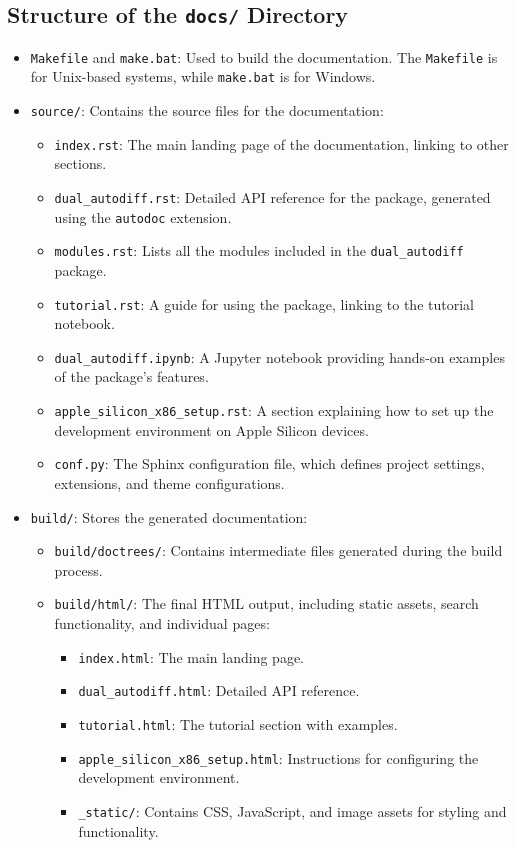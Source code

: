 \documentclass[a4paper,12pt]{article}
\begin{document}
\subsection{Structure of the \texttt{docs/} Directory}
\begin{itemize}
    \item \texttt{Makefile} and \texttt{make.bat}: Used to build the documentation. The \texttt{Makefile} is for Unix-based systems, while \texttt{make.bat} is for Windows.
    \item \texttt{source/}: Contains the source files for the documentation:
    \begin{itemize}
        \item \texttt{index.rst}: The main landing page of the documentation, linking to other sections.
        \item \texttt{dual\_autodiff.rst}: Detailed API reference for the package, generated using the \texttt{autodoc} extension.
        \item \texttt{modules.rst}: Lists all the modules included in the \texttt{dual\_autodiff} package.
        \item \texttt{tutorial.rst}: A guide for using the package, linking to the tutorial notebook.
        \item \texttt{dual\_autodiff.ipynb}: A Jupyter notebook providing hands-on examples of the package's features.
        \item \texttt{apple\_silicon\_x86\_setup.rst}: A section explaining how to set up the development environment on Apple Silicon devices.
        \item \texttt{conf.py}: The Sphinx configuration file, which defines project settings, extensions, and theme configurations.
    \end{itemize}
    \item \texttt{build/}: Stores the generated documentation:
    \begin{itemize}
        \item \texttt{build/doctrees/}: Contains intermediate files generated during the build process.
        \item \texttt{build/html/}: The final HTML output, including static assets, search functionality, and individual pages:
        \begin{itemize}
            \item \texttt{index.html}: The main landing page.
            \item \texttt{dual\_autodiff.html}: Detailed API reference.
            \item \texttt{tutorial.html}: The tutorial section with examples.
            \item \texttt{apple\_silicon\_x86\_setup.html}: Instructions for configuring the development environment.
            \item \texttt{\_static/}: Contains CSS, JavaScript, and image assets for styling and functionality.
        \end{itemize}
    \end{itemize}
\end{itemize}
\end{document}
